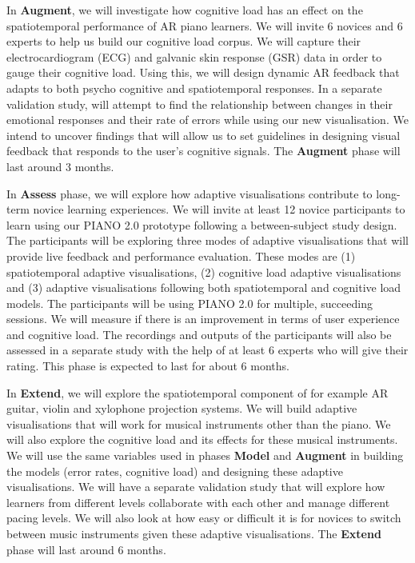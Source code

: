\documentclass[manuscript,screen]{acmart}
\begin{document}
In \textbf{Augment}, we will investigate how cognitive load has an effect on the spatiotemporal performance of AR piano learners. We will invite 6 novices and 6 experts to help us build our cognitive load corpus. We will capture their electrocardiogram (ECG) and galvanic skin response (GSR) data in order to gauge their cognitive load. Using this, we will design dynamic AR feedback that adapts to both psycho cognitive and spatiotemporal responses. In a separate validation study, will attempt to find the relationship between changes in their emotional responses and their rate of errors while using our new visualisation. We intend to uncover findings that will allow us to set guidelines in designing visual feedback that responds to the user's cognitive signals. The \textbf{Augment} phase will last around 3 months. 

In \textbf{Assess} phase, we will explore how adaptive visualisations contribute to long-term novice learning experiences. We will invite at least 12 novice participants to learn using our PIANO 2.0 prototype following a between-subject study design. The participants will be exploring three modes of adaptive visualisations that will provide live feedback and performance evaluation. These modes are (1) spatiotemporal adaptive visualisations, (2) cognitive load adaptive visualisations and (3) adaptive visualisations following both spatiotemporal and cognitive load models. The participants will be using PIANO 2.0 for multiple, succeeding sessions. We will measure if there is an improvement in terms of user experience and cognitive load. The recordings and outputs of the participants will also be assessed in a separate study with the help of at least 6 experts who will give their rating. This phase is expected to last for about 6 months. 

In \textbf{Extend}, we will explore the spatiotemporal component of for example AR guitar, violin and xylophone projection systems. We will build adaptive visualisations that will work for musical instruments other than the piano. We will also explore the cognitive load and its effects for these musical instruments. We will use the same variables used in phases \textbf{Model} and \textbf{Augment} in building the models (error rates, cognitive load) and designing these adaptive visualisations. We will have a separate validation study that will explore how learners from different levels collaborate with each other and manage different pacing levels. We will also look at how easy or difficult it is for novices to switch between music instruments given these adaptive visualisations. The \textbf{Extend} phase will last around 6 months. 
\end{document}
